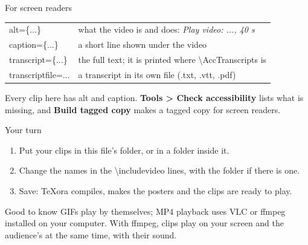 \documentclass[aspectratio=169]{beamer}
\newcommand{\code}[1]{{\small\ttfamily #1}}
\begin{document}
\begin{frame}{For screen readers}
  \small
  \begin{tabular}{@{}ll@{}}
    \code{alt=\{...\}} & what the video is and does: \emph{Play video: ..., 40 s}\\
    \code{caption=\{...\}} & a short line shown under the video\\
    \code{transcript=\{...\}} & the full text; it is printed where \code{\textbackslash AccTranscripts} is\\
    \code{transcriptfile=...} & a transcript in its own file (.txt, .vtt, .pdf)\\
  \end{tabular}
  \par\medskip
  Every clip here has \code{alt} and \code{caption}. \textbf{Tools > Check accessibility} lists what is
  missing, and \textbf{Build tagged copy} makes a tagged copy for screen readers.
\end{frame}

\begin{frame}{Your turn}
  \begin{enumerate}
    \item Put your clips in this file's folder, or in a folder inside it.
    \item Change the names in the \code{\textbackslash includevideo} lines, with the folder if there is one.
    \item Save: TeXora compiles, makes the posters and the clips are ready to play.
  \end{enumerate}
  \par\bigskip
  \begin{block}{Good to know}
    GIFs play by themselves; MP4 playback uses VLC or ffmpeg installed on your computer. With ffmpeg,
    clips play on your screen and the audience's at the same time, with their sound.
  \end{block}
\end{frame}
\end{document}
